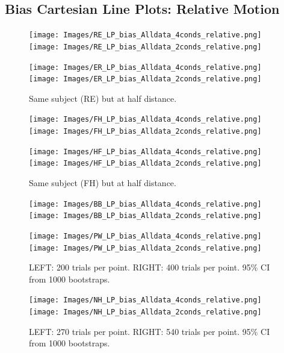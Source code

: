 \documentclass[11pt]{article} %
\begin{document}
\subsection{Bias Cartesian Line Plots: Relative Motion}
\begin{figure}[H]
\centering %
\texttt{[image: Images/RE\_LP\_bias\_Alldata\_4conds\_relative.png]}
\texttt{[image: Images/RE\_LP\_bias\_Alldata\_2conds\_relative.png]}
\end{figure}
\begin{figure}[H]
\centering %
\texttt{[image: Images/ER\_LP\_bias\_Alldata\_4conds\_relative.png]}
\texttt{[image: Images/ER\_LP\_bias\_Alldata\_2conds\_relative.png]}
\caption{Same subject (RE) but at half distance.}
\end{figure}
\begin{figure}[H]
\centering %
\texttt{[image: Images/FH\_LP\_bias\_Alldata\_4conds\_relative.png]}
\texttt{[image: Images/FH\_LP\_bias\_Alldata\_2conds\_relative.png]}
\end{figure}
\begin{figure}[H]
\centering %
\texttt{[image: Images/HF\_LP\_bias\_Alldata\_4conds\_relative.png]}
\texttt{[image: Images/HF\_LP\_bias\_Alldata\_2conds\_relative.png]}
\caption{Same subject (FH) but at half distance.}
\end{figure}
\begin{figure}[H]
\centering %
\texttt{[image: Images/BB\_LP\_bias\_Alldata\_4conds\_relative.png]}
\texttt{[image: Images/BB\_LP\_bias\_Alldata\_2conds\_relative.png]}
\end{figure}
\begin{figure}[H]
\centering %
\texttt{[image: Images/PW\_LP\_bias\_Alldata\_4conds\_relative.png]}
\texttt{[image: Images/PW\_LP\_bias\_Alldata\_2conds\_relative.png]}
\caption{LEFT: 200 trials per point. RIGHT: 400 trials per point. 95\% CI from 1000 bootstraps.}
\end{figure}
\begin{figure}[H]
\centering %
\texttt{[image: Images/NH\_LP\_bias\_Alldata\_4conds\_relative.png]}
\texttt{[image: Images/NH\_LP\_bias\_Alldata\_2conds\_relative.png]}
\caption{LEFT: 270 trials per point. RIGHT: 540 trials per point. 95\% CI from 1000 bootstraps.}
\end{figure}
\end{document}

